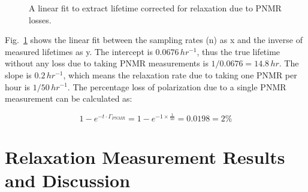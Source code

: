 \begin{figure}[t!]
	\centering
	\caption{{A linear fit to extract lifetime corrected for relaxation due to PNMR losses.}}
	\label{corrected_T1}
\end{figure}

Fig.~\ref{corrected_T1} shows the linear fit between the sampling rates (n) as x and the inverse of measured lifetimes as y. The intercept is $0.0676\,hr^{-1}$, thus the true lifetime without any loss due to taking PNMR measurements is $1/0.0676=14.8\,hr$. The slope is $0.2\,hr^{-1}$, which means the relaxation rate due to taking one PNMR per hour is $1/50\,hr^{-1}$. The percentage loss of polarization due to a single PNMR measurement can be calculated as:

\begin{equation}
1-e^{-t\cdot \Gamma_{PNMR}} = 1-e^{-1\times \frac{1}{50}} =0.0198=2\%
\end{equation}

\section{Relaxation Measurement Results and Discussion}



